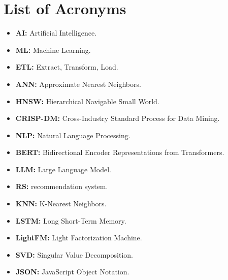 \chapter*{List of Acronyms}

\vspace{1cm}
\begin{itemize}
    \item \textbf{AI:} Artificial Intelligence.
    \item \textbf{ML:} Machine Learning.
    \item \textbf{ETL:}  Extract, Transform, Load.
    \item \textbf{ANN:} Approximate Nearest Neighbors.
    \item \textbf{HNSW:} Hierarchical Navigable Small World.
    \item \textbf{CRISP-DM:} Cross-Industry Standard Process for Data Mining.
    \item \textbf{NLP:} Natural Language Processing.
    \item \textbf{BERT:} Bidirectional Encoder Representations from Transformers.
    \item \textbf{LLM:} Large Language Model.
    \item \textbf{RS:} recommendation system.
    \item \textbf{KNN:} K-Nearest Neighbors.
    \item \textbf{LSTM:} Long Short-Term Memory.
    \item \textbf{LightFM:} Light Factorization Machine.
    \item \textbf{SVD:} Singular Value Decomposition.
    \item \textbf{JSON:}  JavaScript Object Notation.
\end{itemize}
